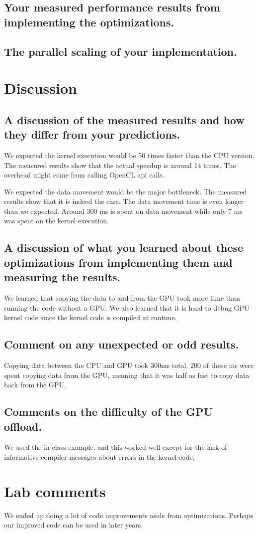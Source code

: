 \documentclass{article}
\begin{document}
\subsection{Your measured performance results from implementing the optimizations.}

\subsection{The parallel scaling of your implementation.}

\section{Discussion}

\subsection{A discussion of the measured results and how they differ
  from your predictions.}
We expected the kernel execution would be 50 times faster than the CPU
version. The measured results show that the actual speedup is around
14 times. The overhead might come from calling OpenCL api calls.

We expected the data movement would be the major bottleneck. The
measured results show that it is indeed the case. The data movement
time is even longer than we expected. Around 300 ms is spent on
data movement while only 7 ms was spent on the kernel execution.

\subsection{A discussion of what you learned about these optimizations from implementing them and measuring the results.}
We learned that copying the data to and from the GPU took more time than running the code without a GPU. We also learned that it is hard to debug GPU kernel code since the kernel code is compiled at runtime.

\subsection{Comment on any unexpected or odd results.}
Copying data between the CPU and GPU took 300ms total. 200 of these ms were spent copying data from the GPU, meaning that it was half as fast to copy data back from the GPU.


\subsection{Comments on the difficulty of the GPU offload.}
We used the in-class example, and this worked well except for the lack of informative compiler messages about errors in the kernel code.

\section{Lab comments}
We ended up doing a lot of code improvements aside from optimizations. Perhaps our improved code can be used in later years.
\end{document}
